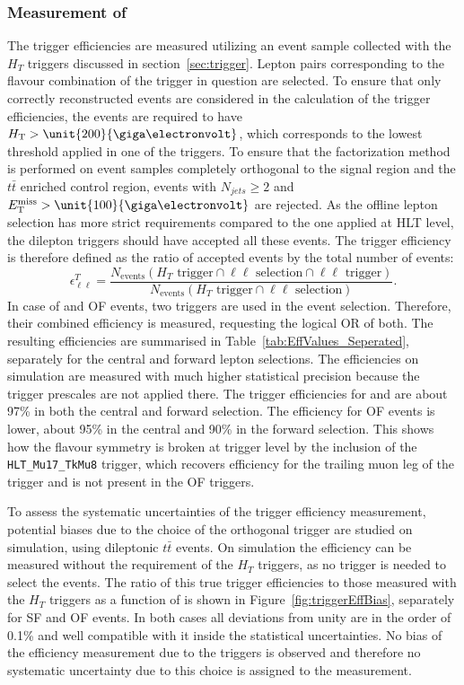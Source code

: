 \subsubsection{Measurement of \RT}
\label{sec:triggerEffs}
The trigger efficiencies are measured utilizing an event sample collected with the $H_T$ triggers discussed in section~\ref{sec:trigger}. Lepton pairs corresponding to the flavour combination of the trigger in question are selected. To ensure that only correctly reconstructed events are considered in the calculation of the trigger efficiencies, the events are required to have $\HT > \unit{200}{\giga\electronvolt}$, which corresponds to the lowest threshold applied in one of the \HT triggers. To ensure that the factorization method is performed on event samples completely orthogonal to the signal region and the $t\bar{t}$ enriched control region, events with $N_{jets} \geq 2$ and $\MET > \unit{100}{\giga\electronvolt}$ are rejected. As the offline lepton selection has more strict requirements compared to the one applied at HLT level, the dilepton triggers should have accepted all these events. The trigger efficiency is therefore defined as the ratio of accepted events by the total number of events:
\begin{equation}
\epsilon_{\ell\ell}^T = \frac{N_{\text{events}}(H_T\text{ trigger} \cap \ell\ell\text{ selection} \cap \ell\ell\text{ trigger})}{N_{\text{events}}(H_T\text{ trigger} \cap \ell\ell\text{ selection})}.
\end{equation}
In case of \MM and OF events, two triggers are used in the event selection. Therefore, their combined efficiency is measured, requesting the logical OR of both. The resulting efficiencies are summarised in Table~\ref{tab:EffValues_Seperated}, separately for the central and forward lepton selections. The efficiencies on simulation are measured with much higher statistical precision because the trigger prescales are not applied there. The trigger efficiencies for \EE and \MM are about 97\% in both the central and forward selection. The efficiency for OF events is lower, about 95\% in the central and 90\% in the forward selection. This shows how the flavour symmetry is broken at trigger level by the inclusion of the \verb+HLT_Mu17_TkMu8+ trigger, which recovers efficiency for the trailing muon leg of the trigger and is not present in the OF triggers.   

To assess the systematic uncertainties of the trigger efficiency measurement, potential biases due to the choice of the orthogonal trigger  are studied on simulation, using dileptonic $t\bar{t}$ events. On simulation the efficiency can be measured without the requirement of the $H_T$ triggers, as no trigger is needed to select the events. The ratio of this true trigger efficiencies to those measured with the $H_T$ triggers as a function of \mll is shown in Figure~\ref{fig:triggerEffBias}, separately for SF and OF events. In both cases all deviations from unity are in the order of 0.1\% and well compatible with it inside the statistical uncertainties. No bias of the efficiency measurement due to the \HT triggers is observed and therefore no systematic uncertainty due to this choice is assigned to the measurement.
